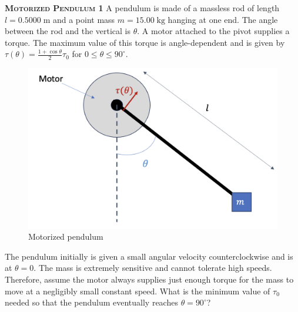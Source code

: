 \begin{problem}
\textbf{\textsc{Motorized Pendulum 1}}
A pendulum is made of a massless rod of length $l=0.5000\;\mathrm{m}$ and a point mass $m=15.00\;\mathrm{kg}$ hanging at one end. The angle between the rod and the vertical is $\theta$. A motor attached to the pivot supplies a torque. The maximum value of this torque is angle-dependent and is given by $\tau (\theta)=\frac{1+\cos\theta}{2} \tau_0$ for $0\leq \theta \leq 90^{\circ}$.

\begin{figure}[h]
    \centering
    \includegraphics[width=0.5\linewidth]{problems/figures/mot_pend.png}
    \caption{Motorized pendulum}
    \label{fig:enter-label}
\end{figure}

The pendulum initially is given a small angular velocity counterclockwise and is at $\theta = 0$. The mass is extremely sensitive and cannot tolerate high speeds. Therefore, assume the motor always supplies just enough torque for the mass to move at a negligibly small constant speed. What is the minimum value of $\tau_0$ needed so that the pendulum eventually reaches $\theta=90^{\circ}$?


\end{problem}